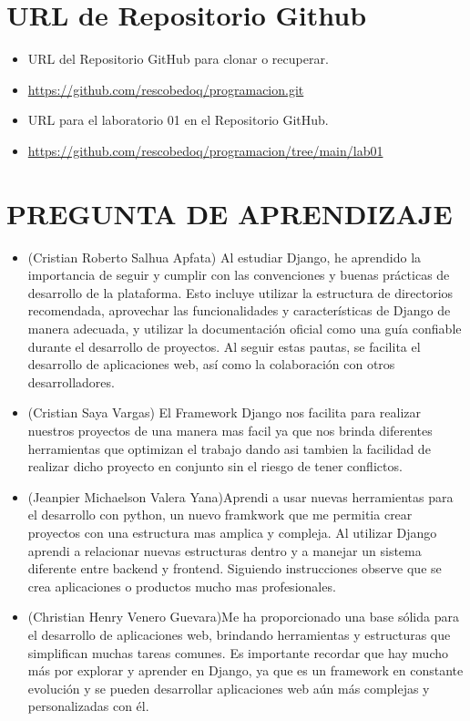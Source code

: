 \documentclass{article}
\begin{document}
	\section{URL de Repositorio Github}
	\begin{itemize}
		\item URL del Repositorio GitHub para clonar o recuperar.
		\item \url{https://github.com/rescobedoq/programacion.git}
		\item URL para el laboratorio 01 en el Repositorio GitHub.
		\item \url{https://github.com/rescobedoq/programacion/tree/main/lab01}
	\end{itemize}
	
\section{PREGUNTA DE APRENDIZAJE}
            \begin{itemize}
		\item (Cristian Roberto Salhua Apfata)
Al estudiar Django, he aprendido la importancia de seguir y cumplir con las convenciones y buenas prácticas de desarrollo de la plataforma. Esto incluye utilizar la estructura de directorios recomendada, aprovechar las funcionalidades y características de Django de manera adecuada, y utilizar la documentación oficial como una guía confiable durante el desarrollo de proyectos. Al seguir estas pautas, se facilita el desarrollo de aplicaciones web, así como la colaboración con otros desarrolladores.
		\item (Cristian Saya Vargas) El Framework Django nos facilita para realizar nuestros proyectos de una manera mas facil ya que nos brinda diferentes herramientas que optimizan el trabajo dando asi tambien la facilidad de realizar dicho proyecto en conjunto sin el riesgo de tener conflictos.
		
		\item (Jeanpier Michaelson Valera Yana)Aprendi a usar nuevas herramientas para el desarrollo con python, un nuevo framkwork que me permitia crear proyectos con una estructura mas amplica y compleja. Al utilizar Django aprendi a relacionar nuevas estructuras dentro y a manejar un sistema diferente entre backend y frontend. Siguiendo instrucciones observe que se crea aplicaciones o productos mucho mas profesionales.
        \item (Christian Henry Venero Guevara)Me ha proporcionado una base sólida para el desarrollo de aplicaciones web, brindando herramientas y estructuras que simplifican muchas tareas comunes. Es importante recordar que hay mucho más por explorar y aprender en Django, ya que es un framework en constante evolución y se pueden desarrollar aplicaciones web aún más complejas y personalizadas con él.
	\end{itemize}
	
\end{document}
